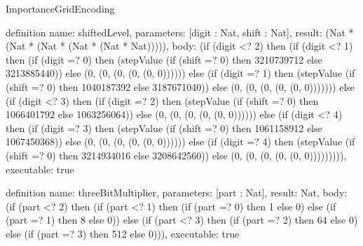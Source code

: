 \begin{lexlean}{ImportanceGridEncoding}
\begin{semanticmodule}
definition{
  name: shiftedLevel,
  parameters: [digit : Nat, shift : Nat],
  result: (Nat * (Nat * (Nat * (Nat * (Nat * Nat))))),
  body: (if (digit <? 2) then
      (if (digit <? 1) then
      (if (digit =? 0) then (stepValue (if (shift =? 0) then 3210739712 else 3213885440)) else (0, (0, (0, (0, (0, 0)))))) else
      (if (digit =? 1) then (stepValue (if (shift =? 0) then 1040187392 else 3187671040)) else (0, (0, (0, (0, (0, 0))))))) else
      (if (digit <? 3) then
      (if (digit =? 2) then (stepValue (if (shift =? 0) then 1066401792 else 1063256064)) else (0, (0, (0, (0, (0, 0)))))) else
      (if (digit <? 4) then
      (if (digit =? 3) then (stepValue (if (shift =? 0) then 1061158912 else 1067450368)) else (0, (0, (0, (0, (0, 0)))))) else
      (if (digit =? 4) then (stepValue (if (shift =? 0) then 3214934016 else 3208642560)) else (0, (0, (0, (0, (0, 0))))))))),
  executable: true
}

definition{
  name: threeBitMultiplier,
  parameters: [part : Nat],
  result: Nat,
  body: (if (part <? 2) then
      (if (part <? 1) then
      (if (part =? 0) then 1 else 0) else
      (if (part =? 1) then 8 else 0)) else
      (if (part <? 3) then
      (if (part =? 2) then 64 else 0) else
      (if (part =? 3) then 512 else 0))),
  executable: true
}


\end{semanticmodule}
\end{lexlean}
